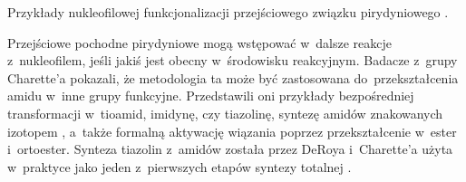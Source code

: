 \begin{marginscheme}[4\baselineskip]
  
  \caption{
    Przykłady nukleofilowej funkcjonalizacji przejściowego związku pirydyniowego
    .
  }
  \label{sch:pyridinium-nu}
\end{marginscheme}
Przejściowe pochodne pirydyniowe 
  mogą wstępować w~dalsze reakcje z~nukleofilem, jeśli jakiś jest obecny w~środowisku reakcyjnym.
Badacze z~grupy Charette'a pokazali, że metodologia ta może być zastosowana do~przekształcenia amidu w~inne grupy funkcyjne.
Przedstawili oni przykłady bezpośredniej transformacji w~tioamid, imidynę, czy tiazolinę, syntezę amidów znakowanych izotopem ,
  a~także formalną aktywację wiązania  poprzez przekształcenie w~ester i~ortoester.
Synteza tiazolin z~amidów została przez DeRoya i~Charette'a użyta w~praktyce jako jeden z~pierwszych etapów syntezy totalnej
  .

